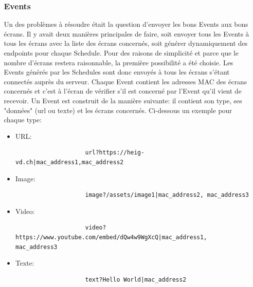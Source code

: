 \documentclass[french]{article}
\begin{document}
\subsubsection{Events}
Un des problèmes à résoudre était la question d'envoyer les bons Events aux bons écrans.
 Il y avait deux manières principales de faire, soit envoyer tous les Events à tous les écrans avec la liste des écrans concernés, soit générer dynamiquement des endpoints pour chaque Schedule. Pour des raisons de simplicité et parce que le nombre d'écrans restera raisonnable, la première possibilité a été choisie. \newline
Les Events générés par les Schedules sont donc envoyés à tous les écrans s'étant connectés auprès du serveur. Chaque Event contient les adresses MAC des écrans concernés et c'est à l'écran de vérifier s'il est concerné par l'Event qu'il vient de recevoir.\newline
Un Event est construit de la manière suivante: il contient son type, ses "données" (url ou texte) et les écrans concernés. Ci-dessous un exemple pour chaque type:\newline
\begin{itemize}
	\item URL:\begin{verbatim}
					url?https://heig-vd.ch|mac_address1,mac_address2
			  \end{verbatim}
	\item Image: \begin{verbatim}
					image?/assets/image1|mac_address2, mac_address3
			  \end{verbatim}
	\item Video: \begin{verbatim}
					video?https://www.youtube.com/embed/dQw4w9WgXcQ|mac_address1, mac_address3
			  \end{verbatim}
	\item Texte: \begin{verbatim}
					text?Hello World|mac_address2
			  \end{verbatim}
\end{itemize}
\end{document}
